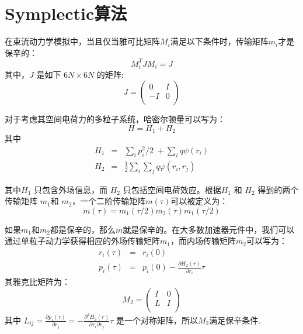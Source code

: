 \section{Symplectic算法}\label{section:theory}

在束流动力学模拟中，当且仅当雅可比矩阵$M_i$满足以下条件时，传输矩阵$ m_i $才是保辛的\cite{accelerator2004lee, accelerator2013chao}：
\begin{equation}
M_{i}^{T}J{{M}_{i}}=J
\end{equation}
其中，$J$ 是如下 $6N\times6N$ 的矩阵:
\begin{equation}
J=\left(
  \begin{array}{cc}
     0 & I \\
    -I & 0 \\
  \end{array}
\right)
\end{equation}

对于考虑其空间电荷力的多粒子系统，哈密尔顿量可以写为：
\begin{equation}
H={{H}_{1}}+{{H}_{2}}
\end{equation}
其中
\begin{eqnarray}
  {H}_{1} &=& \sum\limits_{i}{{p_{i}^{2}}/{2}\;}+\sum\limits_{i}{q\psi ({{r}_{i}})} \\
  {H}_{2} &=& \frac{1}{2}\sum\limits_{i}{\sum\limits_{j}{q\varphi ({{r}_{i}},{{r}_{j}})}}
\end{eqnarray}

其中${{H}_{1}}$ 只包含外场信息，而 ${{H}_{2}}$ 只包括空间电荷效应。根据${{H}_{1}}$ 和 ${{H}_{2}}$ 得到的两个传输矩阵 ${{m}_{1}}$和 ${{m}_{2}}$，一个二阶传输矩阵$m\left( \tau  \right)$可以被定义为：
\begin{equation}
m\left( \tau  \right)={{m}_{1}}\left( \tau /2 \right){{m}_{2}}\left( \tau  \right){{m}_{1}}\left( \tau /2 \right)
\end{equation}

如果$ {{m} _ {1}} $和$ {{m} _ {2}} $都是保辛的，那么$ m $就是保辛的。在大多数加速器元件中，我们可以通过单粒子动力学获得相应的外场传输矩阵$ {{m} _ {1}} $，而内场传输矩阵$ {{m} _ {2}} $可以写为：
\begin{eqnarray}
 {{r}_{i}}(\tau ) &=& {{r}_{i}}(0) \\
 {{p}_{i}}(\tau ) &=& {{p}_{i}}(0)-\frac{\partial {{H}_{2}}(r)}{\partial {{r}_{i}}}\tau
\end{eqnarray}
其雅克比矩阵为：
\begin{equation}
{{M}_{2}}=\left(
\begin{array}{cc}
   I & 0  \\
   L & I  \\
\end{array} \right)
\end{equation}
其中
${{L}_{ij}}=\frac{\partial {{p}_{i}}(\tau )}{\partial {{r}_{j}}}=-\frac{{{\partial }^{2}}{{H}_{2}}(r)}{\partial {{r}_{i}}\partial {{r}_{j}}}\tau$
是一个对称矩阵，所以${{M}_{2}}$满足保辛条件.

